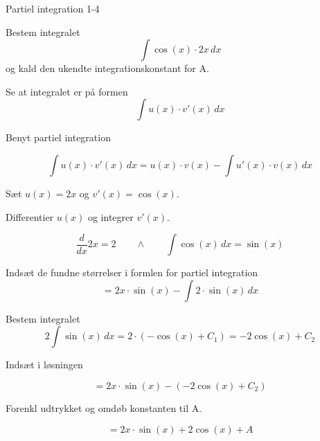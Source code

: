 \documentclass{article}
\begin{document}
\newpage

\begin{exercise}{Partiel integration 1-4}


Bestem integralet
\[
\int \cos(x) \cdot 2x \, dx
\]
og kald den ukendte integrationskonstant for A.



\hint

Se at integralet er på formen
\[
\int u(x) \cdot v'(x) \, dx
\]

\hint

Benyt partiel integration

\hint
\[
\int u(x) \cdot v'(x)\, dx = u(x) \cdot v(x) - \int u'(x) \cdot v(x) \, dx
\]
\hint

Sæt $u(x) = 2x$ og $v'(x) = \cos(x)$.


\hint

Differentier $u(x)$ og integrer $v'(x)$.

\hint
\[
\frac{d}{dx}2x = 2 \qquad \wedge \qquad \int \cos(x) \, dx = \sin(x)
\]

\hint

Indsæt de fundne størrelser i formlen for partiel integration
\[
= 2x \cdot \sin(x) - \int 2 \cdot \sin(x) \, dx
\]

\hint

Bestem integralet
\[
2 \int \sin(x) \, dx = 2 \cdot (- \cos(x) + C_1) = -2 \cos(x) + C_2
\]

\hint
Indsæt i løsningen

\hint

\[
= 2x \cdot \sin(x) -(-2 \cos(x) + C_2)
\]

\hint

Forenkl udtrykket og omdøb konstanten til A.

\hint

\[
= 2x \cdot \sin(x) + 2 \cos(x) + A
\]


\end{exercise}

\newpage
\end{document}
